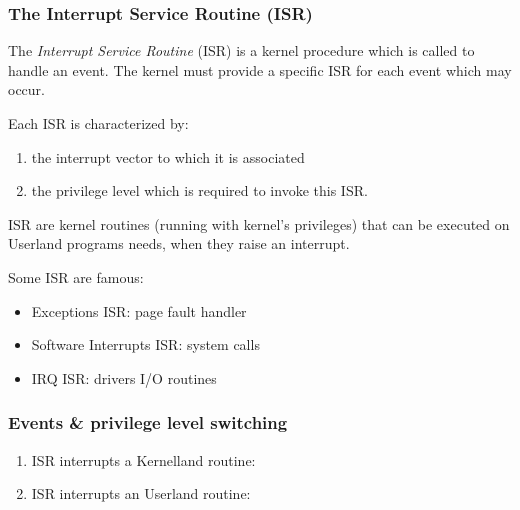 \begin{frame}
  \frametitle{The Interrupt Service Routine (ISR)}

  The {\em Interrupt Service Routine} (ISR) is a kernel procedure which is
  called to handle an event. The kernel must provide a specific ISR for each
  event which may occur.

   \nl

   Each ISR is characterized by:

  \begin{enumerate}
    \item the interrupt vector to which it is associated
    \item the privilege level which is required to invoke this ISR.
  \end{enumerate}

  \nl


  ISR are kernel routines (running with kernel's privileges) that can be
  executed on Userland programs needs, when they raise an interrupt.

  \nl

  Some ISR are famous:

  \begin{itemize}
    \item Exceptions ISR: page fault handler
    \item Software Interrupts ISR: system calls
    \item IRQ ISR: drivers I/O routines
  \end{itemize}

\end{frame}

%
%
%

\begin{frame}
  \frametitle{Events \& privilege level switching}

  \begin{enumerate}
    \item ISR interrupts a Kernelland routine:
      \begin{center}
      \end{center}

    \item ISR interrupts an Userland routine:
      \begin{center}
      \end{center}
  \end{enumerate}

\end{frame}

